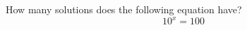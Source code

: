 \documentclass{ximera}
\author{David Kish}
\begin{document}
\begin{exercise}
How many solutions does the following equation have? \\
\[
10^x=100
\]
\begin{multipleChoice}  
\end{multipleChoice}  
\end{exercise}
\end{document}
